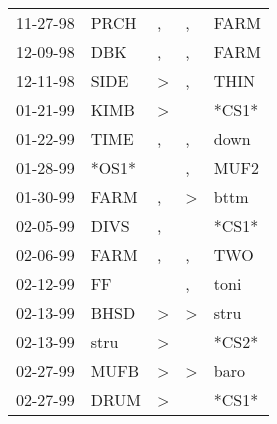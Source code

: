 \begin{supertabular}{p{0.07\textwidth}p{0.06\textwidth}p{0.02\textwidth}p{0.02\textwidth}p{0.06\textwidth}}
          11-27-98\textsuperscript{} &           PRCH\textsuperscript{} &                , &                , &           FARM\textsuperscript{} \\
          12-09-98\textsuperscript{} &            DBK\textsuperscript{} &                , &                , &           FARM\textsuperscript{} \\
          12-11-98\textsuperscript{} &           SIDE\textsuperscript{} &     \textgreater &                , &           THIN\textsuperscript{} \\
          01-21-99\textsuperscript{} &           KIMB\textsuperscript{} &     \textgreater &                  &                            *CS1* \\
          01-22-99\textsuperscript{} &           TIME\textsuperscript{} &                , &                , &           down\textsuperscript{} \\
          01-28-99\textsuperscript{} &                            *OS1* &                  &                , &           MUF2\textsuperscript{} \\
          01-30-99\textsuperscript{} &           FARM\textsuperscript{} &                , &     \textgreater &           bttm\textsuperscript{} \\
          02-05-99\textsuperscript{} &           DIVS\textsuperscript{} &                , &                  &                            *CS1* \\
          02-06-99\textsuperscript{} &           FARM\textsuperscript{} &                , &                , &            TWO\textsuperscript{} \\
          02-12-99\textsuperscript{} &             FF\textsuperscript{} &                  &                , &           toni\textsuperscript{} \\
          02-13-99\textsuperscript{} &           BHSD\textsuperscript{} &     \textgreater &     \textgreater &           stru\textsuperscript{} \\
          02-13-99\textsuperscript{} &           stru\textsuperscript{} &     \textgreater &                  &                            *CS2* \\
          02-27-99\textsuperscript{} &           MUFB\textsuperscript{} &     \textgreater &     \textgreater &           baro\textsuperscript{} \\
          02-27-99\textsuperscript{} &           DRUM\textsuperscript{} &     \textgreater &                  &                            *CS1* \\

\end{supertabular}
